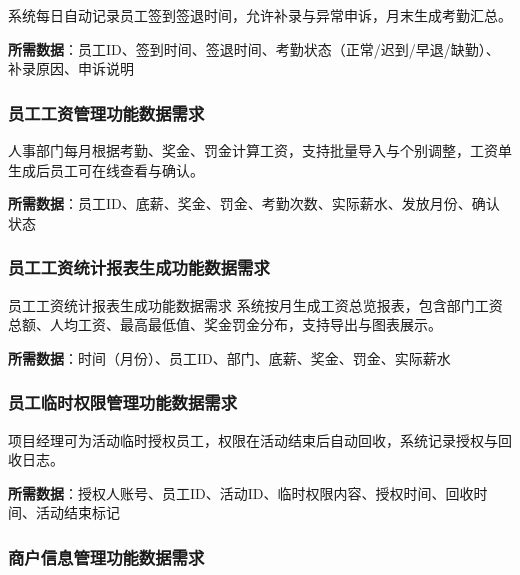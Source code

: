 \documentclass[]{article}
\begin{document}
系统每日自动记录员工签到签退时间，允许补录与异常申诉，月末生成考勤汇总。

\textbf{所需数据}：员工ID、签到时间、签退时间、考勤状态（正常/迟到/早退/缺勤）、补录原因、申诉说明

\hypertarget{ux5458ux5de5ux5de5ux8d44ux7ba1ux7406ux529fux80fdux6570ux636eux9700ux6c42}{%
  \subsubsection{员工工资管理功能数据需求}\label{ux5458ux5de5ux5de5ux8d44ux7ba1ux7406ux529fux80fdux6570ux636eux9700ux6c42}}

人事部门每月根据考勤、奖金、罚金计算工资，支持批量导入与个别调整，工资单生成后员工可在线查看与确认。

\textbf{所需数据}：员工ID、底薪、奖金、罚金、考勤次数、实际薪水、发放月份、确认状态

\hypertarget{ux5458ux5de5ux5de5ux8d44ux7edfux8ba1ux62a5ux8868ux751fux6210ux529fux80fdux6570ux636eux9700ux6c42}{%
  \subsubsection{员工工资统计报表生成功能数据需求}\label{ux5458ux5de5ux5de5ux8d44ux7edfux8ba1ux62a5ux8868ux751fux6210ux529fux80fdux6570ux636eux9700ux6c42}}

员工工资统计报表生成功能数据需求
系统按月生成工资总览报表，包含部门工资总额、人均工资、最高最低值、奖金罚金分布，支持导出与图表展示。

\textbf{所需数据}：时间（月份）、员工ID、部门、底薪、奖金、罚金、实际薪水

\hypertarget{ux5458ux5de5ux4e34ux65f6ux6743ux9650ux7ba1ux7406ux529fux80fdux6570ux636eux9700ux6c42}{%
  \subsubsection{员工临时权限管理功能数据需求}\label{ux5458ux5de5ux4e34ux65f6ux6743ux9650ux7ba1ux7406ux529fux80fdux6570ux636eux9700ux6c42}}

项目经理可为活动临时授权员工，权限在活动结束后自动回收，系统记录授权与回收日志。

\textbf{所需数据}：授权人账号、员工ID、活动ID、临时权限内容、授权时间、回收时间、活动结束标记

\hypertarget{ux5546ux6237ux4fe1ux606fux7ba1ux7406ux529fux80fdux6570ux636eux9700ux6c42}{%
  \subsubsection{商户信息管理功能数据需求}\label{ux5546ux6237ux4fe1ux606fux7ba1ux7406ux529fux80fdux6570ux636eux9700ux6c42}}
\end{document}
